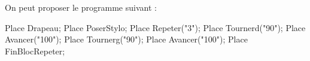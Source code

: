    On peut proposer le programme suivant : \\ [1mm]
   \begin{Scratch}[Echelle=0.7]
      Place Drapeau;
      Place PoserStylo;
      Place Repeter("3");
         Place Tournerd("90");
         Place Avancer("100");
         Place Tournerg("90");
         Place Avancer("100");
      Place FinBlocRepeter;
   \end{Scratch}
